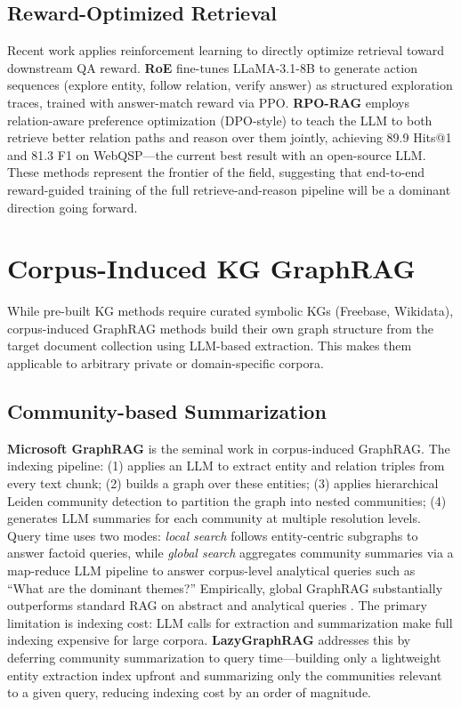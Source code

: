 \documentclass[11pt]{article}
\begin{document}
\subsection{Reward-Optimized Retrieval}
\label{sec:reward}

Recent work applies reinforcement learning to directly optimize retrieval toward downstream QA reward. \textbf{RoE} \cite{han2025roe} fine-tunes LLaMA-3.1-8B to generate action sequences (explore entity, follow relation, verify answer) as structured exploration traces, trained with answer-match reward via PPO. \textbf{RPO-RAG} \cite{um2026rporag} employs relation-aware preference optimization (DPO-style) to teach the LLM to both retrieve better relation paths and reason over them jointly, achieving 89.9 Hits@1 and 81.3 F1 on WebQSP—the current best result with an open-source LLM. These methods represent the frontier of the field, suggesting that end-to-end reward-guided training of the full retrieve-and-reason pipeline will be a dominant direction going forward.

\section{Corpus-Induced KG GraphRAG}
\label{sec:corpus}

While pre-built KG methods require curated symbolic KGs (Freebase, Wikidata), corpus-induced GraphRAG methods build their own graph structure from the target document collection using LLM-based extraction. This makes them applicable to arbitrary private or domain-specific corpora.

\subsection{Community-based Summarization}
\label{sec:community}

\textbf{Microsoft GraphRAG} \cite{edge2024graphrag} is the seminal work in corpus-induced GraphRAG. The indexing pipeline: (1) applies an LLM to extract entity and relation triples from every text chunk; (2) builds a graph over these entities; (3) applies hierarchical Leiden community detection to partition the graph into nested communities; (4) generates LLM summaries for each community at multiple resolution levels. Query time uses two modes: \emph{local search} follows entity-centric subgraphs to answer factoid queries, while \emph{global search} aggregates community summaries via a map-reduce LLM pipeline to answer corpus-level analytical queries such as ``What are the dominant themes?'' Empirically, global GraphRAG substantially outperforms standard RAG on abstract and analytical queries \cite{edge2024graphrag}. The primary limitation is indexing cost: LLM calls for extraction and summarization make full indexing expensive for large corpora. \textbf{LazyGraphRAG} \cite{edge2024graphrag} addresses this by deferring community summarization to query time—building only a lightweight entity extraction index upfront and summarizing only the communities relevant to a given query, reducing indexing cost by an order of magnitude.
\end{document}
